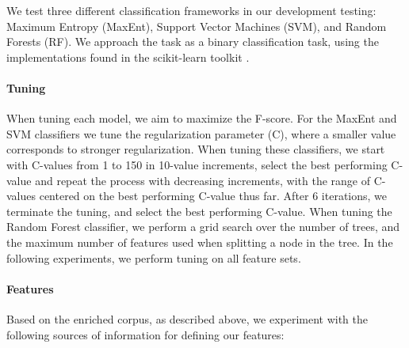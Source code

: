 \documentclass[11pt,letterpaper]{article}
\begin{document}
We test three different classification frameworks in our development testing: Maximum Entropy (MaxEnt), Support Vector Machines (SVM), and Random Forests (RF).  We approach the task as a binary classification task, using the implementations found in the scikit-learn toolkit \cite{scikit-learn}.

\paragraph{Tuning}
When tuning each model, we aim to maximize the F-score. For the MaxEnt and SVM classifiers we tune the regularization parameter (C), where a smaller value corresponds to stronger regularization. When tuning these classifiers, we start with C-values from 1 to 150 in 10-value increments, select the best performing C-value and repeat the process with decreasing increments, with the range of C-values centered on the best performing C-value thus far. After 6 iterations, we terminate the tuning, and select the best performing C-value. When tuning the Random Forest classifier, we perform a grid search over the number of trees, and the maximum number of features used when splitting a node in the tree. %
In the following experiments, we perform tuning on all feature sets.


\paragraph{Features}
Based on the enriched corpus, as described above, we experiment with the following sources of information for defining our features:
\end{document}
